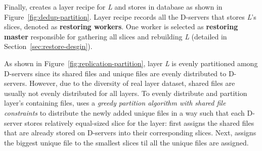 Finally, 
\sysname creates a
layer recipe for \emph{L} and stores in database as shown in Figure~\ref{fig:dedup-partition}.
Layer recipe records all the D-servers that stores \emph{L}'s slices, denoted as \textbf{restoring workers}.
One worker is selected as \textbf{restoring master} responsible for gathering all slices and rebuilding \emph{L} (detailed in Section~\ref{sec:restore-desgin}).
%
%

%
As shown in Figure~\ref{fig:replication-partition},
layer \emph{L} is evenly partitioned among D-servers 
since its shared files and unique files are evenly distributed to D-servers. 
However,
due to the diversity of real layer dataset,
shared files are usually not evenly distributed for all layers. 
To evenly distribute and partition layer's containing files,
%
\sysname uses a \emph{greedy partition algorithm with shared file constraints} to 
distribute the newly added unique files in a way such that
each D-server stores relatively equal-sized slice for the layer:
\sysname first assigns the shared files that are already stored on D-servers into 
their corresponding slices. 
Next,
\sysname
assigns the biggest unique file to the smallest slices
til all the unique files are assigned.






